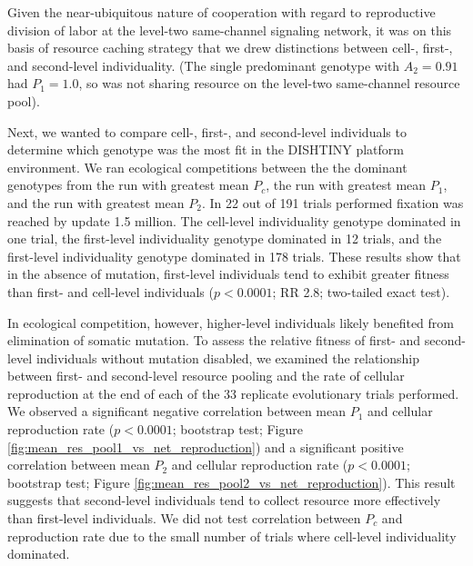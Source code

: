 Given the near-ubiquitous nature of cooperation with regard to reproductive division of labor at the level-two same-channel signaling network, it was on this basis of resource caching strategy that we drew distinctions between cell-, first-, and second-level individuality.
(The single predominant genotype with $A_2 = 0.91$ had $P_1 = 1.0$, so was not sharing resource on the level-two same-channel resource pool).

Next, we wanted to compare cell-, first-, and second-level individuals to determine which genotype was the most fit in the DISHTINY platform environment.
We ran ecological competitions between the the dominant genotypes from the run with greatest mean $P_{c}$, the run with greatest mean $P_1$, and the run with greatest mean $P_2$.
In 22 out of 191 trials performed fixation was reached by update 1.5 million.  The cell-level individuality genotype dominated in one trial, the first-level individuality genotype dominated in 12 trials, and the first-level individuality genotype dominated in 178 trials.
These results show that in the absence of mutation, first-level individuals tend to exhibit greater fitness than first- and cell-level individuals ($p < 0.0001$; RR 2.8; two-tailed exact test).

In ecological competition, however, higher-level individuals likely benefited from elimination of somatic mutation.
To assess the relative fitness of first- and second-level individuals without mutation disabled, we examined the relationship between first- and second-level resource pooling and the rate of cellular reproduction at the end of each of the 33 replicate evolutionary trials performed.
We observed a significant negative correlation between mean $P_1$ and cellular reproduction rate ($p < 0.0001$; bootstrap test; Figure \ref{fig:mean_res_pool1_vs_net_reproduction}) and a significant positive correlation between mean $P_2$ and cellular reproduction rate ($p < 0.0001$; bootstrap test; Figure \ref{fig:mean_res_pool2_vs_net_reproduction}).
This result suggests that second-level individuals tend to collect resource more effectively than first-level individuals.
We did not test correlation between $P_{c}$ and reproduction rate due to the small number of trials where cell-level individuality dominated.

